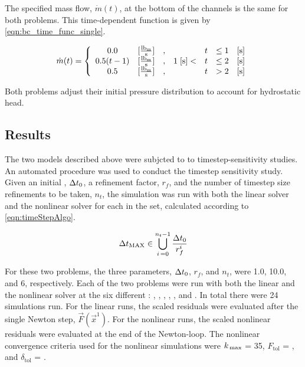 The specified mass flow, $\dot{m}(t)$, at the bottom of the channels is the same for both problems. 
This time-dependent function is given by \eqref{eqn:bc_time_func_single}.

\begin{equation}
\label{eqn:bc_time_func_single}
\dot{m}(t) = \left\{
\begin{array}{cclrcll}
 0.0           & [\frac{ \lbm{} }{\text{s}}] & , &                & t & \leq 1 & [\text{s}] \\
 0.5 ( t - 1)  & [\frac{ \lbm{} }{\text{s}}] & , & 1\; [\text{s}] < & t & \leq 2 & [\text{s}] \\
 0.5           & [\frac{ \lbm{} }{\text{s}}] & , &                & t & > 2    & [\text{s}]
\end{array}\right.
\end{equation}

Both problems adjust their initial pressure distribution to account for hydrostatic head.

\subsection{Results}
\label{subsect:single_results}

The two models described above were subjcted to to timestep-sensitivity studies.
An automated procedure was used to conduct the timestep sensitivity study.
Given an initial \dtmax{}, $\dt{}_{0}$, a refinement factor, $r_{f}$, and the number of timestep size refinements to be taken, $n_{t}$, the simulation was run with both the linear solver and the nonlinear solver for each \dtmax{} in the set, calculated according to \eqref{eqn:timeStepAlgo}.

\begin{equation}
\label{eqn:timeStepAlgo}
\dtmax{} \in \bigcup^{n_{t}-1}_{i\, = 0} \frac{\dt{}_{0}}{r^{i}_{f}}
\end{equation}

For these two problems, the three parameters, $\dt{}_{0}$, $r_{f}$, and $n_{t}$, were 1.0, 10.0, and 6, respectively.
Each of the two problems were run with both the linear and the nonlinear solver at the six different \dtmax{}:  , , , , , and .
In total there were 24 simulations run.
For the linear runs, the scaled residuals were evaluated after the single Newton step, $\vec{F}(\vec{x}^{1})$.
For the nonlinear runs, the scaled nonlinear residuals were evaluated at the end of the Newton-loop.
The nonlinear convergence criteria used for the nonlinear simulations were $\kmax$ = 35, $F_{\text{tol}}$ = , and $\delta_{\text{tol}}$ = .

